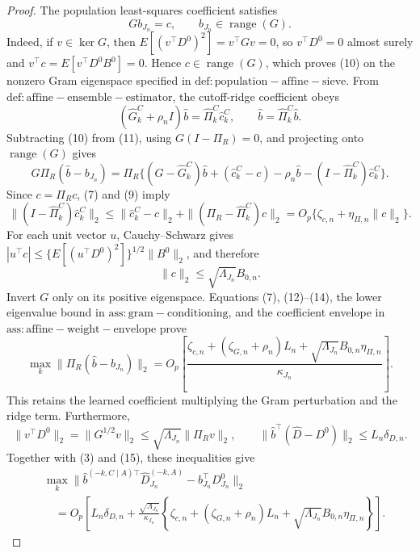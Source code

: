 \documentclass{article}
\begin{document}
\begin{proof}
The population least-squares coefficient satisfies
\[
 Gb_{J_n}=c,\qquad b_{J_n}\in\operatorname{range}(G).                     \tag{10}
\]
Indeed, if \(v\in\ker G\), then \(E[(v^\top D^0)^2]=v^\top Gv=0\), so \(v^\top D^0=0\) almost surely and \(v^\top c=E[v^\top D^0B^0]=0\).  Hence \(c\in\operatorname{range}(G)\), which proves (10) on the nonzero Gram eigenspace specified in \(\mathrm{def:population-affine-sieve}\).  From \(\mathrm{def:affine-ensemble-estimator}\), the cutoff-ridge coefficient obeys
\[
 (\widehat G_k^C+\rho_n I)\widehat b=\widehat\Pi_k^C\widehat c_k^C,
 \qquad \widehat b=\widehat\Pi_k^C\widehat b.                            \tag{11}
\]
Subtracting (10) from (11), using \(G(I-\Pi_R)=0\), and projecting onto \(\operatorname{range}(G)\) gives
\[
 G\Pi_R(\widehat b-b_{J_n})
 =\Pi_R\{(G-\widehat G_k^C)\widehat b+(\widehat c_k^C-c)
 -\rho_n\widehat b-(I-\widehat\Pi_k^C)\widehat c_k^C\}.                 \tag{12}
\]
Since \(c=\Pi_Rc\), (7) and (9) imply
\[
 \|(I-\widehat\Pi_k^C)\widehat c_k^C\|_2
 \le \|\widehat c_k^C-c\|_2+\|(\Pi_R-\widehat\Pi_k^C)c\|_2
 =O_p\{\zeta_{c,n}+\eta_{\Pi,n}\|c\|_2\}.                             \tag{13}
\]
For each unit vector \(u\), Cauchy--Schwarz gives
\(
 |u^\top c|\le\{E[(u^\top D^0)^2]\}^{1/2}\|B^0\|_2
\), and therefore
\[
 \|c\|_2\le\sqrt{\Lambda_{J_n}}B_{0,n}.                                \tag{14}
\]
Invert \(G\) only on its positive eigenspace.  Equations (7), (12)--(14), the lower eigenvalue bound in \(\mathrm{ass:gram-conditioning}\), and the coefficient envelope in \(\mathrm{ass:affine-weight-envelope}\) prove
\[
 \max_k\|\Pi_R(\widehat b-b_{J_n})\|_2
 =O_p\!\left[
 \frac{\zeta_{c,n}+(\zeta_{G,n}+\rho_n)L_n
 +\sqrt{\Lambda_{J_n}}B_{0,n}\eta_{\Pi,n}}
 {\kappa_{J_n}}
 \right].                                                                  \tag{15}
\]
This retains the learned coefficient multiplying the Gram perturbation and the ridge term.  Furthermore,
\[
 \|v^\top D^0\|_2=\|G^{1/2}v\|_2
 \le\sqrt{\Lambda_{J_n}}\|\Pi_Rv\|_2,
 \qquad
 \|\widehat b^\top(\widehat D-D^0)\|_2\le L_n\delta_{D,n}.
\]
Together with (3) and (15), these inequalities give
\[
\begin{aligned}
 &\max_k\|\widehat b^{(-k,C\mid A)\top}\widehat D_{J_n}^{(-k,A)}
       -b_{J_n}^\top D^0_{J_n}\|_2\\
 &\quad=O_p\!\left[L_n\delta_{D,n}
 +\frac{\sqrt{\Lambda_{J_n}}}{\kappa_{J_n}}
 \left\{\zeta_{c,n}+(\zeta_{G,n}+\rho_n)L_n
 +\sqrt{\Lambda_{J_n}}B_{0,n}\eta_{\Pi,n}\right\}\right].             \tag{16}
\end{aligned}
\]


\end{proof}
\end{document}
